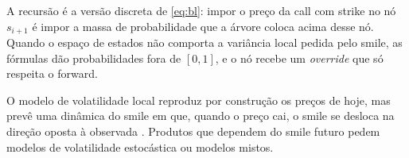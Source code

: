 A recursão é a versão discreta de \eqref{eq:bl}: impor o preço da call com strike no nó $s_{i+1}$ é impor a massa de probabilidade que a árvore coloca acima desse nó. Quando o espaço de estados não comporta a variância local pedida pelo smile, as fórmulas dão probabilidades fora de $[0,1]$, e o nó recebe um \emph{override} que só respeita o forward.

\begin{observacao}
O modelo de volatilidade local reproduz por construção os preços de hoje, mas prevê uma dinâmica do smile em que, quando o preço cai, o smile se desloca na direção oposta à observada \citep{hagan2002}. Produtos que dependem do smile futuro pedem modelos de volatilidade estocástica ou modelos mistos.
\end{observacao}
